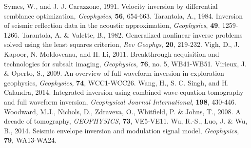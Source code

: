 \documentclass[mreferee]{gji}
\begin{document}
\begin{thebibliography}{}
 Symes, W., and J. J. Carazzone, 1991. Velocity inversion by differential semblance optimization, \textit{Geophysics}, \textbf{56}, 654-663.
   Tarantola, A., 1984. Inversion of seismic reflection data in the acoustic approximation, \textit{Geophysics}, \textbf{49}, 1259-1266.
 Tarantola, A. \& Valette, B., 1982. Generalized nonlinear inverse problems solved using the least squares criterion, \textit{Rev Geophys}, \textbf{20}, 219-232.
 Vigh, D., J. Kapoor, N. Moldoveanu, and H. Li, 2011. Breakthrough acquisition and technologies for subsalt imaging, \textit{Geophysics}, \textbf{76}, no. 5, WB41-WB51.
    Virieux, J. \& Operto, S., 2009. An overview of full-waveform inversion in exploration geophysics, \textit{Geophysics}, \textbf{74}, WCC1-WCC26.
 Wang, H., S. C. Singh, and H. Calandra, 2014. Integrated inversion using combined wave-equation tomography and full waveform inversion, \textit{Geophysical Journal International}, \textbf{198}, 430-446.
 Woodward, M.J., Nichols, D., Zdraveva, O., Whitfield, P. \& Johns, T., 2008. A decade of tomography, \textit{GEOPHYSICS}, \textbf{73}, VE5-VE11.
 Wu, R.-S., Luo, J. \& Wu, B., 2014. Seismic envelope inversion and modulation signal model, \textit{Geophysics}, \textbf{79}, WA13-WA24.

\end{thebibliography}
\end{document}
